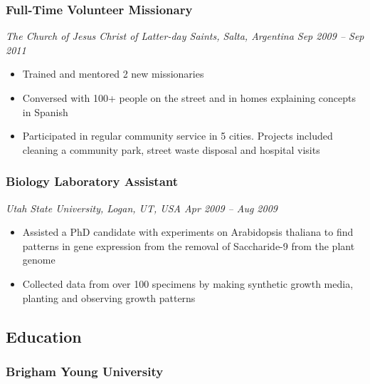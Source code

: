 \hypertarget{full-time-volunteer-missionary}{%
\subsubsection{Full-Time Volunteer
Missionary}\label{full-time-volunteer-missionary}}

\emph{The Church of Jesus Christ of Latter-day Saints, Salta, Argentina
\textbar{} Sep 2009 -- Sep 2011}

\begin{itemize}
\tightlist
\item
  Trained and mentored 2 new missionaries
\item
  Conversed with 100+ people on the street and in homes explaining
  concepts in Spanish
\item
  Participated in regular community service in 5 cities. Projects
  included cleaning a community park, street waste disposal and hospital
  visits
\end{itemize}

\hypertarget{biology-laboratory-assistant}{%
\subsubsection{Biology Laboratory
Assistant}\label{biology-laboratory-assistant}}

\emph{Utah State University, Logan, UT, USA \textbar{} Apr 2009 -- Aug
2009}

\begin{itemize}
\tightlist
\item
  Assisted a PhD candidate with experiments on Arabidopsis thaliana to
  find patterns in gene expression from the removal of Saccharide-9 from
  the plant genome
\item
  Collected data from over 100 specimens by making synthetic growth
  media, planting and observing growth patterns
\end{itemize}

\hypertarget{education}{%
\subsection{Education}\label{education}}

\hypertarget{brigham-young-university}{%
\subsubsection{Brigham Young
University}\label{brigham-young-university}}

